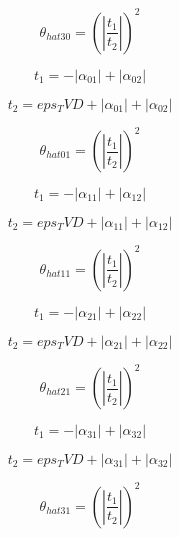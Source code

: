 \documentclass{article}
\begin{document}
\begin{dmath}\theta_{hat 30} = \left(\left|{\frac{t_{1}}{t_{2}}}\right| \right)^{2}\end{dmath}

\begin{dmath}t_{1} = - \left|{\alpha_{01}}\right| + \left|{\alpha_{02}}\right|\end{dmath}

\begin{dmath}t_{2} = eps_TVD + \left|{\alpha_{01}}\right| + \left|{\alpha_{02}}\right|\end{dmath}

\begin{dmath}\theta_{hat 01} = \left(\left|{\frac{t_{1}}{t_{2}}}\right| \right)^{2}\end{dmath}

\begin{dmath}t_{1} = - \left|{\alpha_{11}}\right| + \left|{\alpha_{12}}\right|\end{dmath}

\begin{dmath}t_{2} = eps_TVD + \left|{\alpha_{11}}\right| + \left|{\alpha_{12}}\right|\end{dmath}

\begin{dmath}\theta_{hat 11} = \left(\left|{\frac{t_{1}}{t_{2}}}\right| \right)^{2}\end{dmath}

\begin{dmath}t_{1} = - \left|{\alpha_{21}}\right| + \left|{\alpha_{22}}\right|\end{dmath}

\begin{dmath}t_{2} = eps_TVD + \left|{\alpha_{21}}\right| + \left|{\alpha_{22}}\right|\end{dmath}

\begin{dmath}\theta_{hat 21} = \left(\left|{\frac{t_{1}}{t_{2}}}\right| \right)^{2}\end{dmath}

\begin{dmath}t_{1} = - \left|{\alpha_{31}}\right| + \left|{\alpha_{32}}\right|\end{dmath}

\begin{dmath}t_{2} = eps_TVD + \left|{\alpha_{31}}\right| + \left|{\alpha_{32}}\right|\end{dmath}

\begin{dmath}\theta_{hat 31} = \left(\left|{\frac{t_{1}}{t_{2}}}\right| \right)^{2}\end{dmath}
\end{document}

